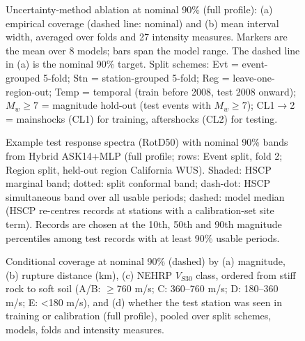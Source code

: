 \begin{figure}[htbp]
\centering
{}
\caption{Uncertainty-method ablation at nominal 90\% (full profile): (a) empirical coverage (dashed line: nominal) and (b) mean interval width, averaged over folds and 27 intensity measures. Markers are the mean over 8 models; bars span the model range. The dashed line in (a) is the nominal 90\% target. Split schemes: Evt = event-grouped 5-fold; Stn = station-grouped 5-fold; Reg = leave-one-region-out; Temp = temporal (train before 2008, test 2008 onward); $M_w{\geq}7$ = magnitude hold-out (test events with $M_w \geq 7$); CL1$\rightarrow$2 = mainshocks (CL1) for training, aftershocks (CL2) for testing.}
\label{fig:fig4_conformal_ablation}
\end{figure}

\begin{figure}[htbp]
\centering
{}
\caption{Example test response spectra (RotD50) with nominal 90\% bands from Hybrid ASK14+MLP (full profile; rows: Event split, fold 2; Region split, held-out region California WUS). Shaded: HSCP marginal band; dotted: split conformal band; dash-dot: HSCP simultaneous band over all usable periods; dashed: model median (HSCP re-centres records at stations with a calibration-set site term). Records are chosen at the 10th, 50th and 90th magnitude percentiles among test records with at least 90\% usable periods.}
\label{fig:fig5_spectral_bands}
\end{figure}

\begin{figure}[htbp]
\centering
{}
\caption{Conditional coverage at nominal 90\% (dashed) by (a) magnitude, (b) rupture distance (km), (c) NEHRP $V_{S30}$ class, ordered from stiff rock to soft soil (A/B: $\geq$760 m/s; C: 360–760 m/s; D: 180–360 m/s; E: <180 m/s), and (d) whether the test station was seen in training or calibration (full profile), pooled over split schemes, models, folds and intensity measures.}
\label{fig:fig6_conditional_coverage}
\end{figure}

